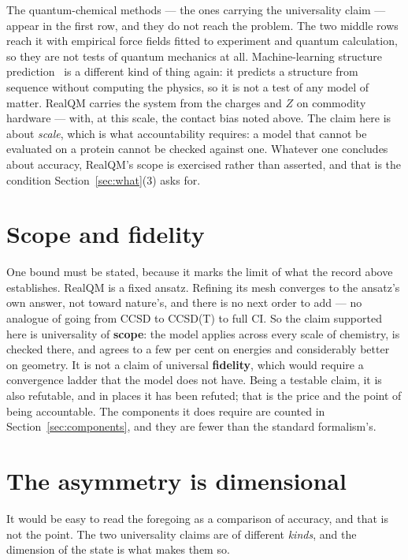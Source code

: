 \documentclass[11pt]{article}
\begin{document}
The quantum-chemical methods --- the ones carrying the universality claim --- appear in the first
row, and they do not reach the problem. The two middle rows reach it with empirical force fields
fitted to experiment and quantum calculation, so they are not tests of quantum mechanics at all.
Machine-learning structure prediction~\cite{Jumper2021} is a different kind of thing again: it
predicts a structure from sequence without computing the physics, so it is not a test of any
model of matter.
RealQM carries the system from the charges and $Z$ on commodity hardware --- with, at this scale,
the contact bias noted above. The claim here is about \emph{scale}, which is what accountability
requires: a model that cannot be evaluated on a protein cannot be checked against one. Whatever
one concludes about accuracy, RealQM's scope is exercised rather than asserted, and that is the
condition Section~\ref{sec:what}(3) asks for.

\section{Scope and fidelity}

One bound must be stated, because it marks the limit of what the record above establishes.
RealQM is a fixed ansatz. Refining its mesh converges to the ansatz's own answer, not toward
nature's, and there is no next order to add --- no analogue of going from CCSD to CCSD(T) to full
CI. So the claim supported here is universality of \textbf{scope}: the model applies across every
scale of chemistry, is checked there, and agrees to a few per cent on energies and considerably
better on geometry. It is not a claim of universal \textbf{fidelity}, which would require a
convergence ladder that the model does not have. Being a testable claim, it is also refutable,
and in places it has been refuted; that is the price and the point of being accountable. The
components it does require are counted in Section~\ref{sec:components}, and they are fewer than
the standard formalism's.

\section{The asymmetry is dimensional}

It would be easy to read the foregoing as a comparison of accuracy, and that is not the point.
The two universality claims are of different \emph{kinds}, and the dimension of the state is what
makes them so.
\end{document}
